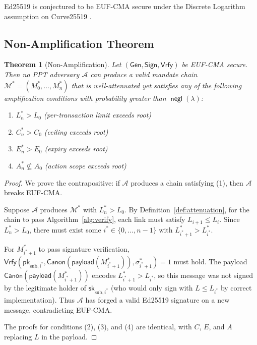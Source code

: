 \documentclass[conference]{IEEEtran}
\newtheorem{theorem}{Theorem}
\DeclareMathOperator{\negl}{\mathsf{negl}}
\newcommand{\Adv}{\mathcal{A}}
\newcommand{\pk}{\mathsf{pk}}
\newcommand{\sk}{\mathsf{sk}}
\newcommand{\sig}{\sigma}
\newcommand{\Sign}{\mathsf{Sign}}
\newcommand{\Vrfy}{\mathsf{Vrfy}}
\newcommand{\Gen}{\mathsf{Gen}}
\newcommand{\canon}{\mathsf{Canon}}
\begin{document}
Ed25519 is conjectured to be EUF-CMA secure under the
Discrete Logarithm assumption on Curve25519
\cite{bernstein2011ed25519,josefsson2017ed25519rfc}.

\subsection{Non-Amplification Theorem}

\begin{theorem}[Non-Amplification]
\label{thm:non_amp}
Let $(\Gen, \Sign, \Vrfy)$ be EUF-CMA secure. Then no PPT
adversary $\Adv$ can produce a valid mandate chain
$\mathcal{M}^* = (M_0^*, \ldots, M_n^*)$ that is
well-attenuated yet satisfies any of the following
amplification conditions with probability greater than
$\negl(\lambda)$:
\begin{enumerate}
  \item $L_n^* > L_0$ (per-transaction limit exceeds root)
  \item $C_n^* > C_0$ (ceiling exceeds root)
  \item $E_n^* > E_0$ (expiry exceeds root)
  \item $A_n^* \not\subseteq A_0$ (action scope exceeds root)
\end{enumerate}
\end{theorem}

\begin{proof}
We prove the contrapositive: if $\Adv$ produces a chain
satisfying (1), then $\Adv$ breaks EUF-CMA.

Suppose $\Adv$ produces $\mathcal{M}^*$ with
$L_n^* > L_0$.  By Definition~\ref{def:attenuation}, for
the chain to pass Algorithm~\ref{alg:verify}, each link
must satisfy $L_{i+1} \leq L_i$.  Since $L_n^* > L_0$,
there must exist some $i^* \in \{0,\ldots,n-1\}$ with
$L_{i^*+1}^* > L_{i^*}^*$.

For $M_{i^*+1}^*$ to pass signature verification,
$\Vrfy(\pk_{\text{sub},i^*}, \canon(\mathsf{payload}
(M_{i^*+1}^*)), \sig_{i^*+1}^*) = 1$ must hold. The
payload $\canon(\mathsf{payload}(M_{i^*+1}^*))$ encodes
$L_{i^*+1}^* > L_{i^*}$, so this message was not signed
by the legitimate holder of $\sk_{\text{sub},i^*}$ (who
would only sign with $L \leq L_{i^*}$ by correct
implementation). Thus $\Adv$ has forged a valid Ed25519
signature on a new message, contradicting EUF-CMA.

The proofs for conditions (2), (3), and (4) are identical,
with $C$, $E$, and $A$ replacing $L$ in the payload.
\end{proof}
\end{document}
